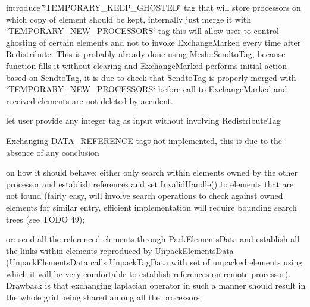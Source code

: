 \begin{DoxyRefList}
\begin{DoxyEnumerate}
\item introduce \char`\"{}\-T\-E\-M\-P\-O\-R\-A\-R\-Y\-\_\-\-K\-E\-E\-P\-\_\-\-G\-H\-O\-S\-T\-E\-D\char`\"{} tag that will store processors on which copy of element should be kept, internally just merge it with \char`\"{}\-T\-E\-M\-P\-O\-R\-A\-R\-Y\-\_\-\-N\-E\-W\-\_\-\-P\-R\-O\-C\-E\-S\-S\-O\-R\-S\char`\"{} tag this will allow user to control ghosting of certain elements and not to invoke Exchange\-Marked every time after Redistribute. This is probably already done using Mesh\-::\-Sendto\-Tag, because function fills it without clearing and Exchange\-Marked performs initial action based on Sendto\-Tag, it is due to check that Sendto\-Tag is properly merged with \char`\"{}\-T\-E\-M\-P\-O\-R\-A\-R\-Y\-\_\-\-N\-E\-W\-\_\-\-P\-R\-O\-C\-E\-S\-S\-O\-R\-S\char`\"{} before call to Exchange\-Marked and received elements are not deleted by accident.
\item let user provide any integer tag as input without involving Redistribute\-Tag 
\end{DoxyEnumerate}
\item[\label{todo__todo000013}%
\hypertarget{todo__todo000013}{}%
Member \hyperlink{classINMOST_1_1Mesh_a2d488479041917c975b1e662d642c4a5}{I\-N\-M\-O\-S\-T\-:\-:Mesh\-:\-:Reduce\-Data} (const Tag \&tag, Element\-Type mask, Marker\-Type select, Reduce\-Operation op)]
\begin{DoxyEnumerate}
\item Exchanging D\-A\-T\-A\-\_\-\-R\-E\-F\-E\-R\-E\-N\-C\-E tags not implemented, this is due to the absence of any conclusion
\end{DoxyEnumerate}
\begin{DoxyItemize}
\item on how it should behave\-: either only search within elements owned by the other processor and establish references and set Invalid\-Handle() to elements that are not found (fairly easy, will involve search operations to check against owned elements for similar entry, efficient implementation will require bounding search trees (see T\-O\-D\-O 49);
\item or\-: send all the referenced elements through Pack\-Elements\-Data and establish all the links within elements reproduced by Unpack\-Elements\-Data (Unpack\-Elements\-Data calls Unpack\-Tag\-Data with set of unpacked elements using which it will be very comfortable to establish references on remote processor). Drawback is that exchanging laplacian operator in such a manner should result in the whole grid being shared among all the processors. 

\end{DoxyItemize}
\end{DoxyRefList}
